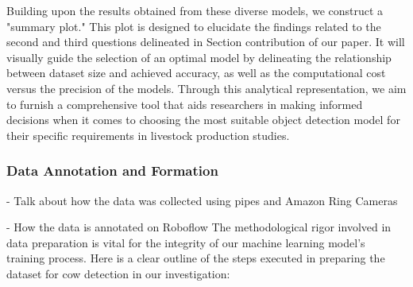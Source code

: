 Building upon the results obtained from these diverse models, we construct a "summary plot." This plot is designed to elucidate the findings related to the second and third questions delineated in Section {contribution} of our paper. It will visually guide the selection of an optimal model by delineating the relationship between dataset size and achieved accuracy, as well as the computational cost versus the precision of the models. Through this analytical representation, we aim to furnish a comprehensive tool that aids researchers in making informed decisions when it comes to choosing the most suitable object detection model for their specific requirements in livestock production studies.

\subsubsection*{Data Annotation and Formation}

- Talk about how the data was collected using pipes and Amazon Ring Cameras

- How the data is annotated on Roboflow
The methodological rigor involved in data preparation is vital for the integrity of our machine learning model's training process. Here is a clear outline of the steps executed in preparing the dataset for cow detection in our investigation:

